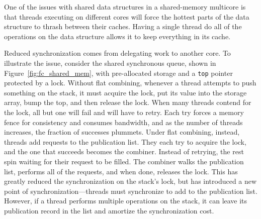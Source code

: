 One of the issues with shared data structures in a shared-memory multicore is that threads executing on different cores will force the hottest parts of the data structure to thrash between their caches. Having a single thread do all of the operations on the data structure allows it to keep everything in its cache.



Reduced synchronization comes from delegating work to another core.
To illustrate the issue, consider the shared synchronous queue, shown in Figure~\ref{fig:fc_shared_mem}, with pre-allocated storage and a \texttt{top} pointer protected by a lock. Without flat combining, whenever a thread attempts to push something on the stack, it must acquire the lock, put its value into the storage array, bump the top, and then release the lock. When many threads contend for the lock, all but one will fail and will have to retry. Each try forces a memory fence for consistency and consumes bandwidth, and as the number of threads increases, the fraction of successes plummets. Under flat combining, instead, threads add requests to the publication list. They each try to acquire the lock, and the one that succeeds becomes the combiner. Instead of retrying, the rest spin waiting for their request to be filled. The combiner walks the publication list, performs all of the requests, and when done, releases the lock. This has greatly reduced the synchronization on the stack's lock, but has introduced a new point of synchronization---threads must synchronize to add to the publication list. However, if a thread performs multiple operations on the stack, it can leave its publication record in the list and amortize the synchronization cost.

